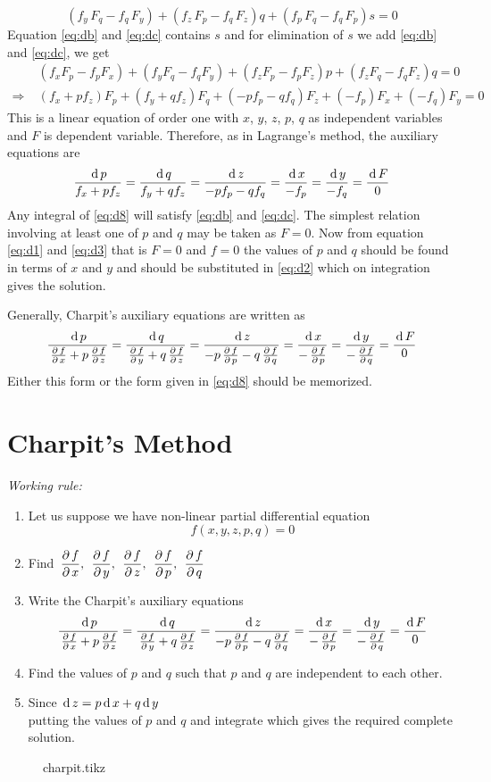 \documentclass[../main-sheet.tex]{subfiles}
\begin{document}
\begin{equation}
    (f_y\,F_q-f_q\,F_y)+(f_z\,F_p-f_q\,F_z)q+(f_p\,F_q-f_q\,F_p)s=0 \label{eq:dc}
\end{equation}
Equation \eqref{eq:db} and \eqref{eq:dc} contains \(s\) and for elimination of \(s\) we add \eqref{eq:db} and \eqref{eq:dc}, we get
\begin{align*}
    &(f_xF_p-f_pF_x)+(f_yF_q-f_qF_y)+(f_zF_p-f_pF_z)p+(f_zF_q-f_qF_z)q=0\\
    \Rightarrow\;&(f_x+pf_z)F_p+(f_y+qf_z)F_q+(-pf_p-qf_q)F_z+(-f_p)F_x+(-f_q)F_y=0
\end{align*}
This is a linear equation of order one with \(x\), \(y\), \(z\), \(p\), \(q\) as independent variables and \(F\) is dependent variable. Therefore, as in Lagrange's method, the auxiliary equations are
\begin{equation}
    \frac{\,\mathrm{d}\, p}{f_x+pf_z}=\frac{\,\mathrm{d}\, q}{f_y+qf_z}=\frac{\,\mathrm{d}\, z}{-pf_p-qf_q}=\frac{\,\mathrm{d}\, x}{-f_p}=\frac{\,\mathrm{d}\, y}{-f_q}=\frac{\,\mathrm{d}\, F}{0} \label{eq:d8}
\end{equation}
Any integral of \eqref{eq:d8} will satisfy \eqref{eq:db} and \eqref{eq:dc}. The simplest relation involving at least one of \(p\) and \(q\) may be taken as \(F=0\). Now from equation \eqref{eq:d1} and \eqref{eq:d3} that is \(F=0\) and \(f=0\) the values of \(p\) and \(q\) should be found in terms of \(x\) and \(y\) and should be substituted in \eqref{eq:d2} which on integration gives the solution.

Generally, Charpit's auxiliary equations are written as
\[
    \frac{\,\mathrm{d}\, p}{\,\frac{\partial\, f}{\partial\, x}+p\,\frac{\partial\, f}{\partial\, z}}=\frac{\,\mathrm{d}\, q}{\,\frac{\partial\, f}{\partial\, y}+q\,\frac{\partial\, f}{\partial\, z}}=\frac{\,\mathrm{d}\, z}{-p\,\frac{\partial\, f}{\partial\, p}-q\,\frac{\partial\, f}{\partial\, q}}=\frac{\,\mathrm{d}\, x}{-\,\frac{\partial\, f}{\partial\, p}}=\frac{\,\mathrm{d}\, y}{-\,\frac{\partial\, f}{\partial\, q}}=\frac{\,\mathrm{d}\, F}{0}
\]
Either this form or the form given in \eqref{eq:d8} should be memorized.
\section{Charpit's Method}
\emph{Working rule:}
\begin{enumerate}
    \item Let us suppose we have non-linear partial differential equation 
    \begin{equation}
        f(x,y,z,p,q)=0 \label{eq:dia1}
    \end{equation}
    \item Find \(\displaystyle \,\frac{\partial\, f}{\partial\, x},\;\,\frac{\partial\, f}{\partial\, y},\;\,\frac{\partial\, f}{\partial\, z},\;\,\frac{\partial\, f}{\partial\, p},\;\,\frac{\partial\, f}{\partial\, q}\)
    \item Write the Charpit's auxiliary equations\[\frac{\,\mathrm{d}\, p}{\,\frac{\partial\, f}{\partial\, x}+p\,\frac{\partial\, f}{\partial\, z}}=\frac{\,\mathrm{d}\, q}{\,\frac{\partial\, f}{\partial\, y}+q\,\frac{\partial\, f}{\partial\, z}}=\frac{\,\mathrm{d}\, z}{-p\,\frac{\partial\, f}{\partial\, p}-q\,\frac{\partial\, f}{\partial\, q}}=\frac{\,\mathrm{d}\, x}{-\,\frac{\partial\, f}{\partial\, p}}=\frac{\,\mathrm{d}\, y}{-\,\frac{\partial\, f}{\partial\, q}}=\frac{\,\mathrm{d}\, F}{0}\]
    \item Find the values of \(p\) and \(q\) such that \(p\) and \(q \) are independent to each other.
    \item Since \(\,\mathrm{d}\, z=p\,\mathrm{d}\, x+q\,\mathrm{d}\, y\)\\
    putting the values of \(p\) and \(q\) and integrate which gives the required complete solution.
\end{enumerate}
\begin{figure}[H]
    \centering
    {charpit.tikz}
\end{figure}
\end{document}
